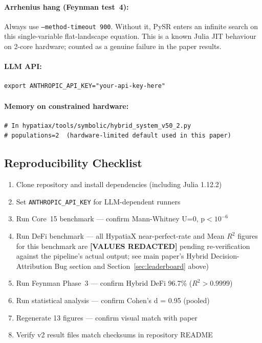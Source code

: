 \documentclass[twoside,11pt]{article}
\begin{document}
\paragraph{Arrhenius hang (Feynman test~4):}
Always use \texttt{--method-timeout 900}. Without it, PySR enters an
infinite search on this single-variable flat-landscape equation.
This is a known Julia JIT behaviour on 2-core hardware; counted as a
genuine failure in the paper results.

\paragraph{LLM API:}
\begin{small}
\begin{verbatim}
export ANTHROPIC_API_KEY="your-api-key-here"
\end{verbatim}
\end{small}

\paragraph{Memory on constrained hardware:}
\begin{small}
\begin{verbatim}
# In hypatiax/tools/symbolic/hybrid_system_v50_2.py
# populations=2  (hardware-limited default used in this paper)
\end{verbatim}
\end{small}

\subsection{Reproducibility Checklist}

\begin{enumerate}
\item Clone repository and install dependencies (including Julia 1.12.2)
\item Set \texttt{ANTHROPIC\_API\_KEY} for LLM-dependent runners
\item Run Core~15 benchmark — confirm Mann-Whitney U=0, p$<10^{-6}$
\item Run DeFi benchmark --- all HypatiaX near-perfect-rate and Mean $R^2$
  figures for this benchmark are \textbf{[VALUES REDACTED]} pending
  re-verification against the pipeline's actual output; see main paper's
  Hybrid Decision-Attribution Bug section and Section~\ref{sec:leaderboard}
  above)
\item Run Feynman Phase~3 — confirm Hybrid DeFi 96.7\% ($R^2>0.9999$)
\item Run statistical analysis — confirm Cohen's d = 0.95 (pooled)
\item Regenerate 13 figures — confirm visual match with paper
\item Verify v2 result files match checksums in repository README
\end{enumerate}
\end{document}
